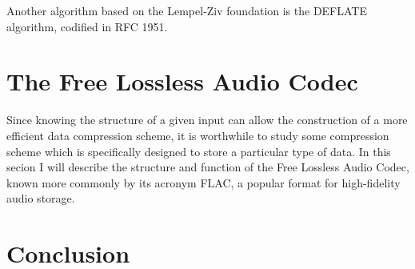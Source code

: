 \documentclass[12pt]{article}
\begin{document}
Another algorithm based on the Lempel-Ziv foundation is the DEFLATE
algorithm, codified in RFC 1951. \cite{RFC1951}

\section{The Free Lossless Audio Codec}

Since knowing the structure of a given input can allow the
construction of a more efficient data compression scheme, it is
worthwhile to study some compression scheme which is specifically
designed to store a particular type of data. In this secion I will
describe the structure and function of the Free Lossless Audio Codec,
known more commonly by its acronym FLAC, a popular format for
high-fidelity audio storage.

\section{Conclusion}





\end{document}
